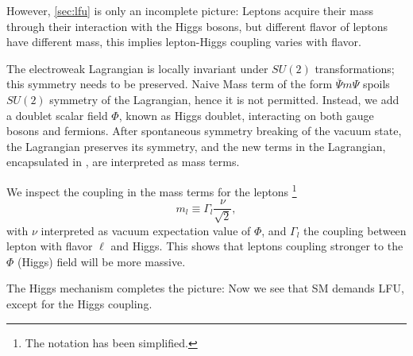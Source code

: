 However, \autoref{sec:lfu} is only an incomplete picture:
Leptons acquire their mass through their interaction with the Higgs bosons,
but different flavor of leptons have different mass, this implies lepton-Higgs
coupling varies with flavor.

The electroweak Lagrangian is locally invariant under $SU(2)$ transformations;
this symmetry needs to be preserved.
Naive Mass term of the form $\overline{\Psi} m \Psi$
spoils $SU(2)$ symmetry of the Lagrangian, hence it is not permitted.
Instead, we add a doublet scalar field $\Phi$, known as Higgs doublet,
interacting on both gauge bosons and fermions.
After spontaneous symmetry breaking of the vacuum state, the Lagrangian
preserves its symmetry, and the new terms in the Lagrangian, encapsulated in
, are interpreted as mass terms.

We inspect the coupling in the mass terms for the
leptons \cite{Langacker:2010zza}\footnote{
    The notation has been simplified.
}
\begin{equation}
    m_l \equiv \Gamma_l \frac{\nu}{\sqrt{2}},
\end{equation}
with $\nu$ interpreted as vacuum expectation value of $\Phi$, and $\Gamma_l$ the
coupling between lepton with flavor $\ell$ and Higgs.
This shows that leptons coupling stronger to the $\Phi$ (Higgs) field will be
more massive.

The Higgs mechanism completes the picture:
Now we see that SM demands LFU, except for the Higgs coupling.
